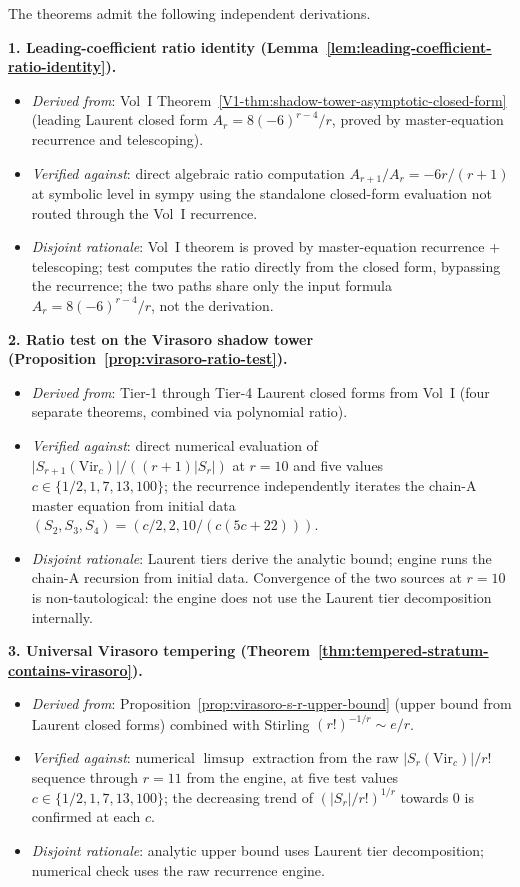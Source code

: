 The theorems admit the following independent derivations.

\textbf{1. Leading-coefficient ratio identity
(Lemma~\ref{lem:leading-coefficient-ratio-identity}).}
\begin{itemize}[nosep]
\item \emph{Derived from}: Vol~I
 Theorem~\ref{V1-thm:shadow-tower-asymptotic-closed-form} (leading Laurent
 closed form $A_r = 8 (-6)^{r-4}/r$, proved by master-equation
 recurrence and telescoping).
\item \emph{Verified against}: direct algebraic ratio computation
 $A_{r+1} / A_r = -6 r / (r+1)$ at symbolic level in sympy
 using the
 standalone closed-form evaluation not routed through the Vol~I
 recurrence.
\item \emph{Disjoint rationale}: Vol~I theorem is proved by
 master-equation recurrence + telescoping; test computes the ratio
 directly from the closed form, bypassing the recurrence; the two
 paths share only the input formula $A_r = 8 (-6)^{r-4}/r$, not the
 derivation.
\end{itemize}

\textbf{2. Ratio test on the Virasoro shadow tower
(Proposition~\ref{prop:virasoro-ratio-test}).}
\begin{itemize}[nosep]
\item \emph{Derived from}: Tier-1 through Tier-4 Laurent closed forms
 from Vol~I (four
 separate theorems, combined via polynomial ratio).
\item \emph{Verified against}: direct numerical evaluation of
 $\lvert S_{r+1}(\mathrm{Vir}_c) \rvert / ((r+1) \lvert S_r \rvert)$
 at $r = 10$ and five values $c \in \{1/2, 1, 7, 13, 100\}$; the
 recurrence independently iterates the chain-A master equation from
 initial data $(S_2, S_3, S_4) = (c/2, 2, 10/(c(5c+22)))$.
\item \emph{Disjoint rationale}: Laurent tiers derive the analytic
 bound; engine runs the chain-A recursion from initial data.
 Convergence of the two sources at $r = 10$ is non-tautological: the
 engine does not use the Laurent tier decomposition internally.
\end{itemize}

\textbf{3. Universal Virasoro tempering
(Theorem~\ref{thm:tempered-stratum-contains-virasoro}).}
\begin{itemize}[nosep]
\item \emph{Derived from}: Proposition~\ref{prop:virasoro-s-r-upper-bound}
 (upper bound from Laurent closed forms) combined with Stirling
 $(r!)^{-1/r} \sim e/r$.
\item \emph{Verified against}: numerical $\limsup$ extraction
 from the raw $|S_r(\mathrm{Vir}_c)|/r!$ sequence through $r = 11$
 from the engine, at five test values $c \in \{1/2, 1, 7, 13, 100\}$;
 the decreasing trend of $(|S_r|/r!)^{1/r}$ towards $0$ is confirmed
 at each $c$.
\item \emph{Disjoint rationale}: analytic upper bound uses Laurent
 tier decomposition; numerical check uses the raw recurrence engine.
\end{itemize}

